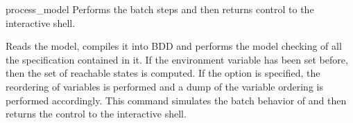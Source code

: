 \begin{nusmvCommand}{process\_model} {Performs the batch steps and then returns control to the interactive shell.}


Reads the model, compiles it into BDD and performs the model checking
of all the specification contained in it. If the environment variable
 has been set before, then the set of
reachable states is computed. If the option  is specified,
the reordering of variables is performed and a dump of the variable
ordering is performed accordingly. This command simulates the batch
behavior of \tool and then returns the control to the interactive
shell.

\begin{cmdOpt}
 
 

\end{cmdOpt}
\end{nusmvCommand}
